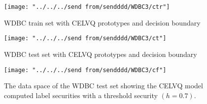 \documentclass[english]{HSMW-Thesis}
\begin{document}

\begin{figure}[H]
	\centering
	\texttt{[image: "../../../send from/sendddd/WDBC3/ctr"]}
	\caption[WDBC train set with CELVQ prototypes]{WDBC train set with CELVQ prototypes and decision boundary}
	\label{fig:c1}
\end{figure}


\begin{figure}[H]
	\centering
	\texttt{[image: "../../../send from/sendddd/WDBC3/ct"]}
	\caption[WDBC test set with CELVQ prototypes]{WDBC test set with CELVQ prototypes and decision boundary}
	\label{fig:c2}
\end{figure}


\begin{figure}[H]
	\centering
	\texttt{[image: "../../../send from/sendddd/WDBC3/cf"]}
	\caption[WDBC test set classification label security (CELVQ)]{The data space of the WDBC test set showing the CELVQ model computed label securities with a threshold security $(h=0.7)$.}
	\label{fig:cdl}
\end{figure}


\end{document}
